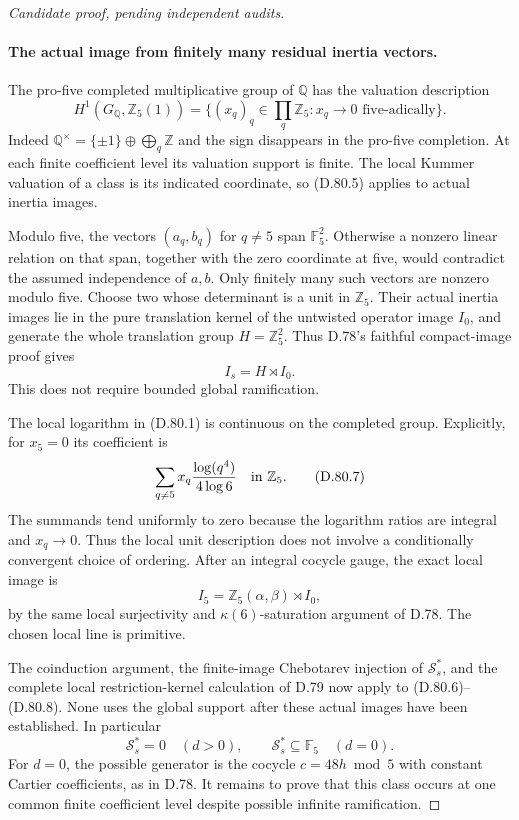\begin{proof}[Candidate proof, pending independent audits]
\paragraph{The actual image from finitely many residual inertia vectors.}
The pro-five completed multiplicative group of \(\mathbb Q\)
has the valuation description
\[
 H^1(G_{\mathbb Q},\mathbb Z_5(1))
   =\{(x_q)_q\in\prod_q\mathbb Z_5:
                     x_q\longrightarrow0\text{ five-adically}\}.
                                                               \tag{D.80.5}
\]
Indeed \(\mathbb Q^\times=\{\pm1\}\oplus\bigoplus_q\mathbb Z\)
and the sign disappears in the pro-five completion. At each
finite coefficient level its valuation support is finite.
The local Kummer valuation of a class is its indicated
coordinate, so (D.80.5) applies to actual inertia images.

Modulo five, the vectors \((a_q,b_q)\) for \(q\ne5\)
span \(\mathbb F_5^2\). Otherwise a nonzero linear relation
on that span, together with the zero coordinate at five,
would contradict the assumed independence of \(a,b\).
Only finitely many such vectors are nonzero modulo five.
Choose two whose determinant is a unit in \(\mathbb Z_5\).
Their actual inertia images lie in the pure translation
kernel of the untwisted operator image \(I_0\), and
generate the whole translation group \(H=\mathbb Z_5^2\).
Thus D.78's faithful compact-image proof gives
\[
                         I_s=H\rtimes I_0.             \tag{D.80.6}
\]
This does not require bounded global ramification.

The local logarithm in (D.80.1) is continuous on the completed
group. Explicitly, for \(x_5=0\) its coefficient is
\[
      \sum_{q\ne5}x_q\frac{\log(q^4)}{4\log6}
                          \quad\hbox{in }\mathbb Z_5.
                                                               \tag{D.80.7}
\]
The summands tend uniformly to zero because the logarithm
ratios are integral and \(x_q\to0\). Thus the local unit
description does not involve a conditionally convergent
choice of ordering. After an integral cocycle gauge,
the exact local image is
\[
 I_5=\mathbb Z_5(\alpha,\beta)\rtimes I_0,              \tag{D.80.8}
\]
by the same local surjectivity and \(\kappa(6)\)-saturation
argument of D.78. The chosen local line is primitive.

The coinduction argument, the finite-image Chebotarev
injection of \(\mathcal S_s^*\), and the complete local
restriction-kernel calculation of D.79 now apply to
(D.80.6)--(D.80.8). None uses the global support after
these actual images have been established. In particular
\[
 \mathcal S_s^*=0\quad(d>0),\qquad
 \mathcal S_s^*\subseteq\mathbb F_5\quad(d=0).           \tag{D.80.9}
\]
For \(d=0\), the possible generator is the cocycle
\(c=48h\bmod5\) with constant Cartier coefficients,
as in D.78. It remains to prove that this class occurs
at one common finite coefficient level despite possible
infinite ramification.


\end{proof}
